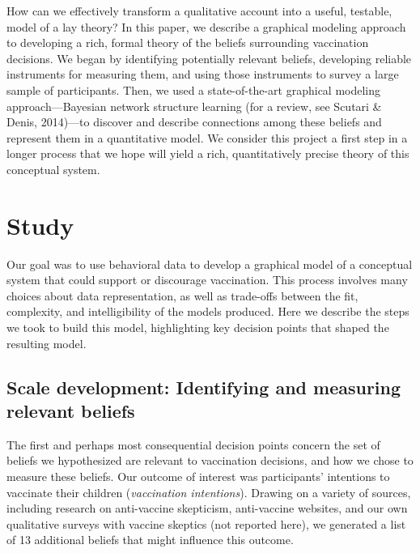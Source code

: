 \documentclass[10pt, letterpaper]{article}
\begin{document}
How can we effectively transform a qualitative account into a useful,
testable, model of a lay theory? In this paper, we describe a graphical
modeling approach to developing a rich, formal theory of the beliefs
surrounding vaccination decisions. We began by identifying potentially
relevant beliefs, developing reliable instruments for measuring them,
and using those instruments to survey a large sample of participants.
Then, we used a state-of-the-art graphical modeling approach---Bayesian
network structure learning (for a review, see Scutari \& Denis,
2014)---to discover and describe connections among these beliefs and
represent them in a quantitative model. We consider this project a first
step in a longer process that we hope will yield a rich, quantitatively
precise theory of this conceptual system.

\section{Study}\label{study}

Our goal was to use behavioral data to develop a graphical model of a
conceptual system that could support or discourage vaccination. This
process involves many choices about data representation, as well as
trade-offs between the fit, complexity, and intelligibility of the
models produced. Here we describe the steps we took to build this model,
highlighting key decision points that shaped the resulting model.

\subsection{Scale development: Identifying and measuring relevant
beliefs}\label{scale-development-identifying-and-measuring-relevant-beliefs}

The first and perhaps most consequential decision points concern the set
of beliefs we hypothesized are relevant to vaccination decisions, and
how we chose to measure these beliefs. Our outcome of interest was
participants' intentions to vaccinate their children (\emph{vaccination
intentions}). Drawing on a variety of sources, including research on
anti-vaccine skepticism, anti-vaccine websites, and our own qualitative
surveys with vaccine skeptics (not reported here), we generated a list
of 13 additional beliefs that might influence this outcome.
\end{document}
